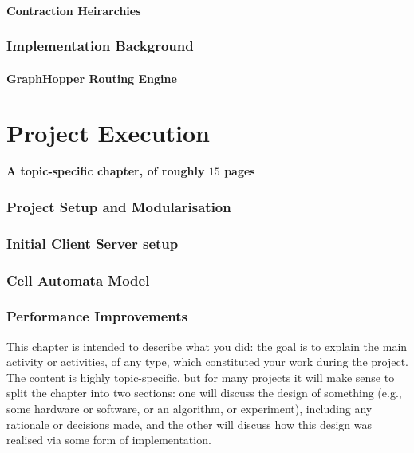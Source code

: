 \documentclass[ %
                    author={Alexander Hill},
                supervisor={Dr. Benjamin Sach},
                    degree={MEng},
                     title={MARMOSET: Multi Agent Routing for Managing Online Smart-cities for Efficient Transportation},
                  subtitle={},
                      type={research},
                      year={2016} ]{dissertation}
\begin{document}
\subsubsection{Contraction Heirarchies}

\subsection{Implementation Background}

\subsubsection{GraphHopper Routing Engine}


\chapter{Project Execution}
\label{chap:execution}

{\bf A topic-specific chapter, of roughly $15$ pages}
\vspace{1cm}

\subsection{Project Setup and Modularisation}

\subsection{Initial Client Server setup}

\subsection{Cell Automata Model}

\subsection{Performance Improvements}

\noindent
This chapter is intended to describe what you did: the goal is to explain
the main activity or activities, of any type, which constituted your work
during the project.  The content is highly topic-specific, but for many
projects it will make sense to split the chapter into two sections: one
will discuss the design of something (e.g., some hardware or software, or
an algorithm, or experiment), including any rationale or decisions made,
and the other will discuss how this design was realised via some form of
implementation.
\end{document}
